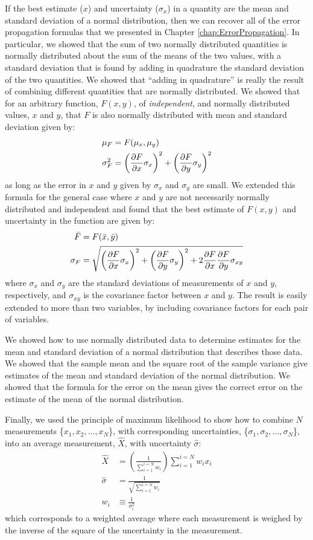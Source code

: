 \begin{chapterSummary}
If the best estimate ($x$) and uncertainty ($\sigma_x$) in a quantity are the mean and standard deviation of a normal distribution, then we can recover all of the error propagation formulas that we presented in Chapter \ref{chap:ErrorPropagation}. In particular, we showed that the sum of two normally distributed quantities is normally distributed about the sum of the means of the two values, with a standard deviation that is found by adding in quadrature the standard deviation of the two quantities. We showed that ``adding in quadrature'' is really the result of combining different quantities that are normally distributed. We showed that for an arbitrary function, $F(x,y)$, of \textit{independent}, and normally distributed values, $x$ and $y$, that $F$ is also normally distributed with mean and standard deviation given by:
\begin{align}
\mu_F &=F(\mu_x,\mu_y)\nonumber\\
\sigma_F^2&=\left(\frac{\partial F}{\partial x}\sigma_x\right)^2+\left(\frac{\partial F}{\partial y}\sigma_y\right)^2
\end{align}
as long as the error in $x$ and $y$ given by $\sigma_x$ and $\sigma_y$ are small. We extended this formula for the general case where $x$ and $y$ are not necessarily normally distributed and independent and found that the best estimate of $F(x,y)$ and uncertainty in the function are given by:
\begin{align}
\bar F&=F(\bar x, \bar y)\nonumber\\
\sigma_F&=\sqrt{\left(\frac{\partial F}{\partial x}\sigma_x\right)^2+\left(\frac{\partial F}{\partial y}\sigma_y\right)^2+2\frac{\partial F}{\partial x}\frac{\partial F}{\partial y}\sigma_{xy}}
\end{align} 
where $\sigma_x$ and $\sigma_y$ are the standard deviations of measurements of $x$ and $y$, respectively, and $\sigma_{xy}$ is the covariance factor between $x$ and $y$. The result is easily extended to more than two variables, by including covariance factors for each pair of variables.

We showed how to use normally distributed data to determine estimates for the mean and standard deviation of a normal distribution that describes those data. We showed that the sample mean and the square root of the sample variance give estimates of the mean and standard deviation of the normal distribution. We showed that the formula for the error on the mean gives the correct error on the estimate of the mean of the normal distribution.

Finally, we used the principle of maximum likelihood to show how to combine $N$ measurements \{$x_1, x_2, \dots, x_N$\}, with corresponding uncertainties, \{$\sigma_1, \sigma_2, \dots, \sigma_N  $\}, into an average measurement, $\hat X$, with uncertainty $\hat \sigma$:
\begin{align}
\hat X &= \left(\frac{1}{\sum_{i=1}^{i=N} w_i}\right)\sum_{i=1}^{i=N} w_i x_i\nonumber\\
\hat \sigma&=\frac{1}{\sqrt{\sum_{i=1}^{i=N}w_i}}\nonumber\\
w_i &\equiv \frac{1}{\sigma_i^2}
\end{align}
which corresponds to a weighted average where each measurement is weighed by the inverse of the square of the uncertainty in the measurement.
\end{chapterSummary}